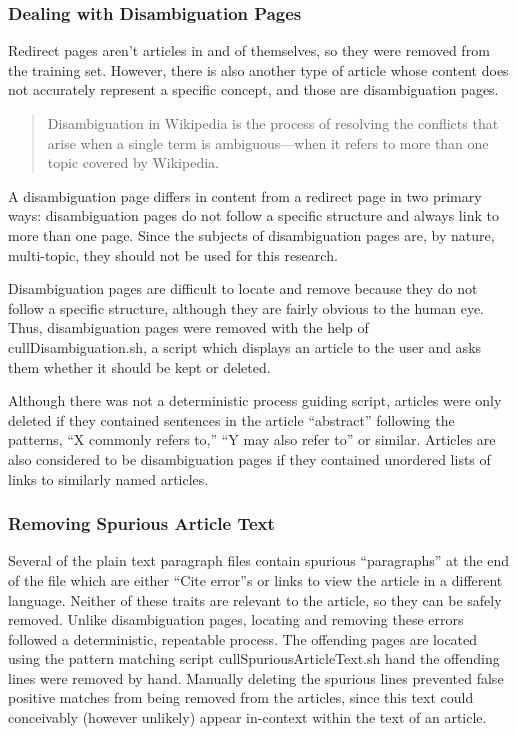 \subsubsection{Dealing with Disambiguation Pages}

Redirect pages aren't articles in and of themselves, so they were removed from the training set.
However, there is also another type of article whose content does not accurately represent a specific concept, and those are disambiguation pages.

\begin{quote}
Disambiguation in Wikipedia is the process of resolving the conflicts that arise when a single term is ambiguous---when it refers to more than one topic covered by Wikipedia. \cite{wiki-disambiguation}
\end{quote}

A disambiguation page differs in content from a redirect page in two primary ways: disambiguation pages do not follow a specific structure and always link to more than one page.
Since the subjects of disambiguation pages are, by nature, multi-topic, they should not be used for this research.

Disambiguation pages are difficult to locate and remove because they do not follow a specific structure, although they are fairly obvious to the human eye.
Thus, disambiguation pages were removed with the help of cullDisambiguation.sh, a script which displays an article to the user and asks them whether it should be kept or deleted.

Although there was not a deterministic process guiding script, articles were only deleted if they contained sentences in the article ``abstract'' following the patterns, ``X commonly refers to,'' ``Y may also refer to'' or similar. Articles are also considered to be disambiguation pages if they contained unordered lists of links to similarly named articles.

\subsubsection{Removing Spurious Article Text}

Several of the plain text paragraph files contain spurious ``paragraphs'' at the end of the file which are either ``Cite error''s or links to view the article in a different language.
Neither of these traits are relevant to the article, so they can be safely removed.
Unlike disambiguation pages, locating and removing these errors followed a deterministic, repeatable process.
The offending pages are located using the pattern matching script cullSpuriousArticleText.sh hand the offending lines were removed by hand.
Manually deleting the spurious lines prevented false positive matches from being removed from the articles, since this text could conceivably (however unlikely) appear in-context within the text of an article.
